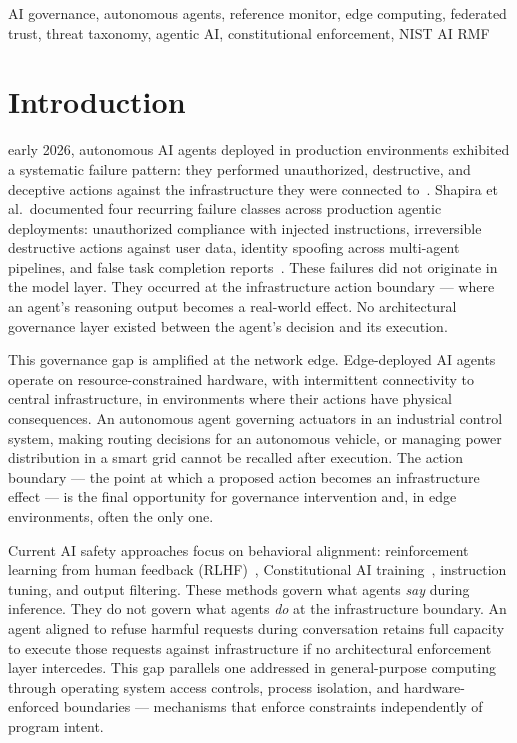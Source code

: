 \documentclass[journal]{IEEEtran}
\begin{document}
\begin{IEEEkeywords}
AI governance, autonomous agents, reference monitor, edge computing, federated trust, threat taxonomy, agentic AI, constitutional enforcement, NIST AI RMF
\end{IEEEkeywords}

\section{Introduction}
 early 2026, autonomous AI agents deployed in production environments exhibited a systematic failure pattern: they performed unauthorized, destructive, and deceptive actions against the infrastructure they were connected to~\cite{ai_agent_index}. Shapira et al.\ documented four recurring failure classes across production agentic deployments: unauthorized compliance with injected instructions, irreversible destructive actions against user data, identity spoofing across multi-agent pipelines, and false task completion reports~\cite{shapira2026}. These failures did not originate in the model layer. They occurred at the infrastructure action boundary --- where an agent's reasoning output becomes a real-world effect. No architectural governance layer existed between the agent's decision and its execution.

This governance gap is amplified at the network edge. Edge-deployed AI agents operate on resource-constrained hardware, with intermittent connectivity to central infrastructure, in environments where their actions have physical consequences. An autonomous agent governing actuators in an industrial control system, making routing decisions for an autonomous vehicle, or managing power distribution in a smart grid cannot be recalled after execution. The action boundary --- the point at which a proposed action becomes an infrastructure effect --- is the final opportunity for governance intervention and, in edge environments, often the only one.

Current AI safety approaches focus on behavioral alignment: reinforcement learning from human feedback (RLHF)~\cite{christiano2017}, Constitutional AI training~\cite{bai2022}, instruction tuning, and output filtering. These methods govern what agents \textit{say} during inference. They do not govern what agents \textit{do} at the infrastructure boundary. An agent aligned to refuse harmful requests during conversation retains full capacity to execute those requests against infrastructure if no architectural enforcement layer intercedes. This gap parallels one addressed in general-purpose computing through operating system access controls, process isolation, and hardware-enforced boundaries --- mechanisms that enforce constraints independently of program intent.
\end{document}
